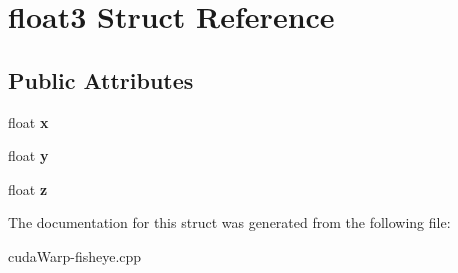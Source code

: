 \hypertarget{structfloat3}{}\section{float3 Struct Reference}
\label{structfloat3}
\subsection*{Public Attributes}
\begin{DoxyCompactItemize}
\item 
float {\bfseries x}\hypertarget{structfloat3_af621f02abb1c788738fe61ea9807ff9c}{}\label{structfloat3_af621f02abb1c788738fe61ea9807ff9c}

\item 
float {\bfseries y}\hypertarget{structfloat3_aa6147d421a81889971f8c66aa92abf0d}{}\label{structfloat3_aa6147d421a81889971f8c66aa92abf0d}

\item 
float {\bfseries z}\hypertarget{structfloat3_a772dffd42d89f350c5a1b766c4703245}{}\label{structfloat3_a772dffd42d89f350c5a1b766c4703245}

\end{DoxyCompactItemize}


The documentation for this struct was generated from the following file\+:\begin{DoxyCompactItemize}
\item 
cuda\+Warp-\/fisheye.\+cpp\end{DoxyCompactItemize}
